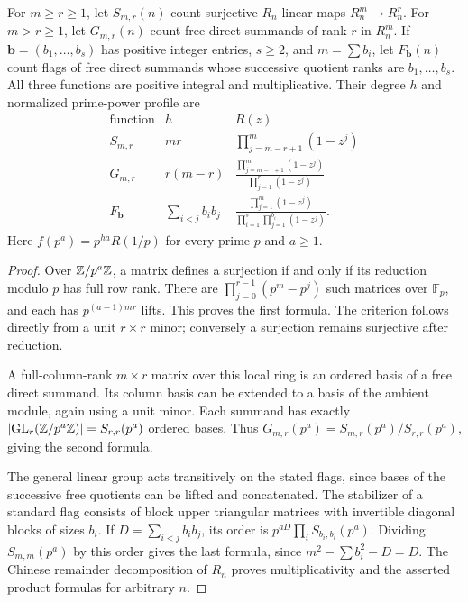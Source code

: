 \begin{proposition}
\label{prop:v5-finite-counts}
For $m\ge r\ge1$, let $S_{m,r}(n)$ count surjective $R_n$-linear maps
$R_n^m\longrightarrow R_n^r$.  For $m>r\ge1$, let $G_{m,r}(n)$ count
free direct summands of rank $r$ in $R_n^m$.  If
$\mathbf b=(b_1,\ldots,b_s)$ has positive integer entries, $s\ge2$,
and $m=\sum b_i$, let $F_{\mathbf b}(n)$ count flags of free direct
summands whose successive quotient ranks are $b_1,\ldots,b_s$.
All three functions are positive integral and multiplicative.  Their
degree $h$ and normalized prime-power profile are
\[
\begin{array}{c|c|c}
\text{function}&h&R(z)\\ \hline
S_{m,r}&mr&\displaystyle\prod_{j=m-r+1}^{m}(1-z^j)\\[4pt]
G_{m,r}&r(m-r)&\displaystyle
 \frac{\prod_{j=m-r+1}^{m}(1-z^j)}{\prod_{j=1}^{r}(1-z^j)}\\[6pt]
F_{\mathbf b}&\displaystyle\sum_{i<j}b_i b_j&\displaystyle
 \frac{\prod_{j=1}^{m}(1-z^j)}
      {\prod_{i=1}^{s}\prod_{j=1}^{b_i}(1-z^j)}.
\end{array}
\]
Here $f(p^a)=p^{ha}R(1/p)$ for every prime $p$ and $a\ge1$.
\end{proposition}
\begin{proof}
Over $\mathbb Z/p^a\mathbb Z$, a matrix defines a surjection if and only if its
reduction modulo $p$ has full row rank.  There are
$\prod_{j=0}^{r-1}(p^m-p^j)$ such matrices over $\mathbb F_p$,
and each has $p^{(a-1)mr}$ lifts.  This proves the first formula.
The criterion follows directly from a unit $r\times r$ minor; conversely
a surjection remains surjective after reduction.

A full-column-rank $m\times r$ matrix over this local ring is an ordered
basis of a free direct summand.  Its column basis can be extended to a
basis of the ambient module, again using a unit minor.  Each summand
has exactly $|\mathrm{GL}_r(\mathbb Z/p^a\mathbb Z)|=S_{r,r}(p^a)$ ordered bases.
Thus $G_{m,r}(p^a)=S_{m,r}(p^a)/S_{r,r}(p^a)$, giving the second formula.

The general linear group acts transitively on the stated flags, since
bases of the successive free quotients can be lifted and concatenated.
The stabilizer of a standard flag consists of block upper triangular
matrices with invertible diagonal blocks of sizes $b_i$.  If
$D=\sum_{i<j}b_i b_j$, its order is
$p^{aD}\prod_i S_{b_i,b_i}(p^a)$.  Dividing $S_{m,m}(p^a)$ by this
order gives the last formula, since $m^2-\sum b_i^2-D=D$.
The Chinese remainder decomposition of $R_n$ proves multiplicativity
and the asserted product formulas for arbitrary $n$.
\end{proof}

